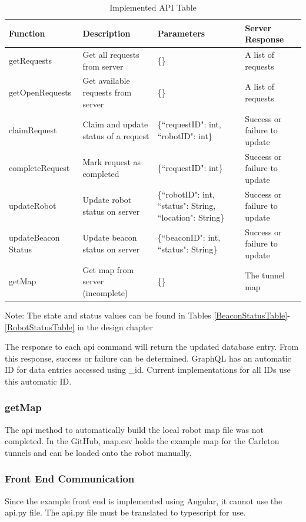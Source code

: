 \documentclass[12pt]{report}
\begin{document}
\begin{table}[H]
\centering
\caption{Implemented API Table}
\label{ImpAPITable}
\centering
\begin{tabular} { | p{3cm} | p{3.5cm} | p{4cm} | p{3cm} | }
\hline
Function & Description & Parameters & Server Response\\
\hline
getRequests & Get all requests from server & \{\} & A list of requests \\
\hline
getOpenRequests & Get available requests from server & \{\} & A list of requests \\
\hline
claimRequest & Claim and update status of a request & \{``requestID": int, ``robotID": int\} & Success or failure to update \\
\hline
completeRequest & Mark request as completed & \{``requestID": int\} & Success or failure to update \\
\hline
updateRobot & Update robot status on server & \{``robotID": int, ``status": String, ``location": String\}  & Success or failure to update \\
\hline
updateBeacon Status & Update beacon status on server & \{``beaconID": int, ``status": String\} & Success or failure to update \\
\hline
getMap & Get map from server (incomplete) & \{\} & The tunnel map \\
\hline
\end{tabular}
\begin{tablenotes}
      \small
      \centering
      \item Note: The state and status values can be found in Tables \ref{BeaconStatusTable}-\ref{RobotStatusTable} in the design chapter
\end{tablenotes}
\end{table}%

The response to each api command will return the updated database entry. From this response, success or failure can be determined. 
GraphQL has an automatic ID for data entries accessed using \_id. Current implementations for all IDs use this automatic ID.

\subsubsection{getMap}
The api method to automatically build the local robot map file was not  completed. In the GitHub, map.csv holds the example map for the Carleton tunnels and can be loaded onto the robot manually. 

\subsubsection{Front End Communication}
Since the example front end is implemented using Angular, it cannot use the api.py file. The api.py file must be translated to typescript for use. 
\end{document}
